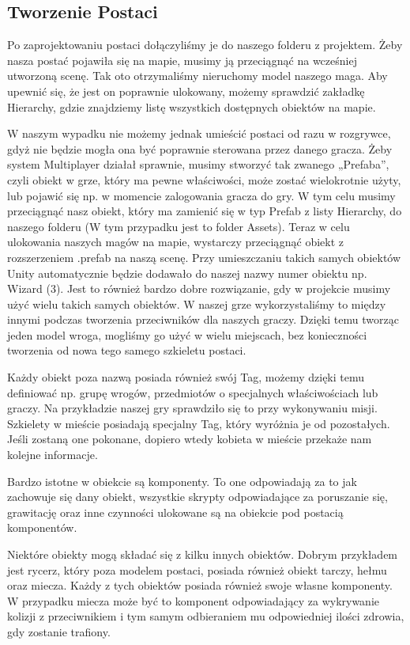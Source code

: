 \subsection{Tworzenie Postaci}
Po zaprojektowaniu postaci dołączyliśmy je do naszego folderu z projektem. Żeby nasza postać pojawiła się na mapie, musimy ją przeciągnąć na wcześniej utworzoną scenę. Tak oto otrzymaliśmy nieruchomy model naszego maga. Aby upewnić się, że jest on poprawnie ulokowany, możemy sprawdzić zakładkę Hierarchy, gdzie znajdziemy listę wszystkich dostępnych obiektów na mapie. 

W naszym wypadku nie możemy jednak umieścić postaci od razu w rozgrywce, gdyż nie będzie mogła ona być poprawnie sterowana przez danego gracza. Żeby system Multiplayer działał sprawnie, musimy stworzyć tak zwanego „Prefaba”, czyli obiekt w grze, który ma pewne właściwości, może zostać wielokrotnie użyty, lub pojawić się np. w momencie zalogowania gracza do gry. W tym celu musimy przeciągnąć nasz obiekt, który ma zamienić się w typ Prefab z listy Hierarchy, do naszego folderu (W tym przypadku jest to folder Assets). Teraz w celu ulokowania naszych magów na mapie, wystarczy przeciągnąć obiekt z rozszerzeniem .prefab na naszą scenę. Przy umieszczaniu takich samych obiektów Unity automatycznie będzie dodawało do naszej nazwy numer obiektu np. Wizard (3). Jest to również bardzo dobre rozwiązanie, gdy w projekcie musimy użyć wielu takich samych obiektów. W naszej grze wykorzystaliśmy to między innymi podczas tworzenia przeciwników dla naszych graczy. Dzięki temu tworząc jeden model wroga, mogliśmy go użyć w wielu miejscach, bez konieczności tworzenia od nowa tego samego szkieletu postaci.

Każdy obiekt poza nazwą posiada również swój Tag, możemy dzięki temu definiować np. grupę wrogów, przedmiotów o specjalnych właściwościach lub graczy. Na przykładzie naszej gry sprawdziło się to przy wykonywaniu misji. Szkielety w mieście posiadają specjalny Tag, który wyróżnia je od pozostałych. Jeśli zostaną one pokonane, dopiero wtedy kobieta w mieście przekaże nam kolejne informacje.

Bardzo istotne w obiekcie są komponenty. To one odpowiadają za to jak zachowuje się dany obiekt, wszystkie skrypty odpowiadające za poruszanie się, grawitację oraz inne czynności ulokowane są na obiekcie pod postacią komponentów.

Niektóre obiekty mogą składać się z kilku innych obiektów. Dobrym przykładem jest rycerz, który poza modelem postaci, posiada również obiekt tarczy, hełmu oraz miecza. Każdy z tych obiektów posiada również swoje własne komponenty. W przypadku miecza może być to komponent odpowiadający za wykrywanie kolizji z przeciwnikiem i tym samym odbieraniem mu odpowiedniej ilości zdrowia, gdy zostanie trafiony.
